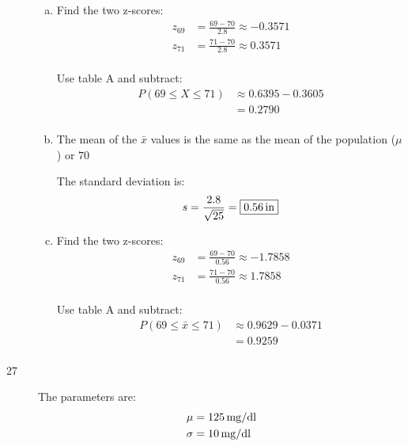 \documentclass[letterpaper]{exam}
\begin{document}
\begin{description}
        \begin{enumerate}[(a)]
          \item Find the two z-scores:
            \begin{align*}
              z_{69} &= \frac{69 - 70}{2.8} \approx -0.3571 \\
              z_{71} &= \frac{71 - 70}{2.8} \approx 0.3571 \\
            \end{align*}

            Use table A and subtract:
            \begin{align*}
              P(69 \leq X \leq 71) & \approx 0.6395 - 0.3605 \\
                                   & = \boxed{ 0.2790 } \\
            \end{align*}

          \item 
            The mean of the $\bar{x}$ values is the same as the mean of the
            population ($\mu$) or $\boxed{ 70 }$

            The standard deviation is:
            \[
              s = \frac{2.8}{\sqrt{25}} = \boxed{ \unit[0.56]{in} }
            \]

          \newpage

          \item Find the two z-scores:
            \begin{align*}
              z_{69} &= \frac{69 - 70}{0.56} \approx -1.7858 \\
              z_{71} &= \frac{71 - 70}{0.56} \approx 1.7858 \\
            \end{align*}

            Use table A and subtract:
            \begin{align*}
              P(69 \leq \bar{x} \leq 71) & \approx 0.9629 - 0.0371 \\
                                         & = \boxed{ 0.9259 } \\
            \end{align*}

        \end{enumerate}

      \item[27]
        The parameters are:
        \begin{align*}
          \mu    & = \unit[125]{mg/dl} \\
          \sigma & = \unit[10]{mg/dl} \\
        \end{align*}


\end{description}
\end{document}
